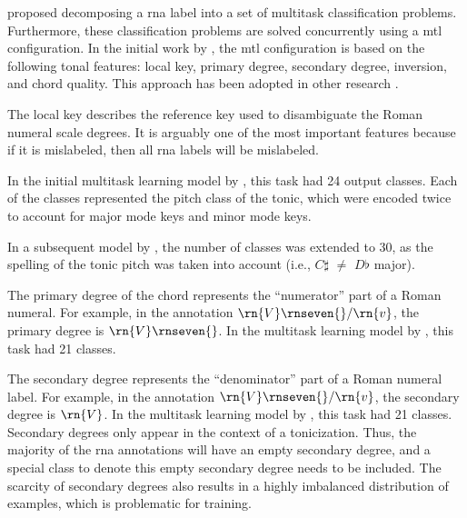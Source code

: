 
\textcite{chen2018functional} proposed decomposing a
\gls{rna} label into a set of multitask classification
problems. Furthermore, these classification problems are
solved concurrently using a \gls{mtl} configuration. In the
initial work by \textcite{chen2018functional}, the \gls{mtl}
configuration is based on the following tonal features:
local key, primary degree, secondary degree, inversion, and
chord quality. This approach has been adopted in other
research \parencite{chen2019harmony,
micchi2020not,micchi2021deep}.


The local key describes the reference key used to
disambiguate the Roman numeral scale degrees. It is arguably
one of the most important features because if it is
mislabeled, then all \gls{rna} labels will be mislabeled.

In the initial multitask learning model by
\textcite{chen2018functional}, this task had 24 output
classes. Each of the classes represented the pitch class of
the tonic, which were encoded twice to account for major
mode keys and minor mode keys.

In a subsequent model by \textcite{micchi2020not}, the
number of classes was extended to 30, as the spelling of the
tonic pitch was taken into account (i.e., $C\sharp$ $\neq$
$D\flat$ major).



The primary degree of the chord represents the ``numerator''
part of a Roman numeral. For example, in the annotation
$\rn{V}\rnseven{}/\rn{v}$, the primary degree is
$\rn{V}\rnseven{}$. In the multitask learning model by
\textcite{chen2018functional}, this task had 21 classes.


The secondary degree represents the ``denominator'' part of
a Roman numeral label. For example, in the annotation
$\rn{V}\rnseven{}/\rn{v}$, the secondary degree is $\rn{V}$.
In the multitask learning model by
\textcite{chen2018functional}, this task had 21 classes.
Secondary degrees only appear in the context of a
tonicization. Thus, the majority of the \gls{rna}
annotations will have an empty secondary degree, and a
special class to denote this empty secondary degree needs to
be included. The scarcity of secondary degrees also results
in a highly imbalanced distribution of examples, which is
problematic for training.

